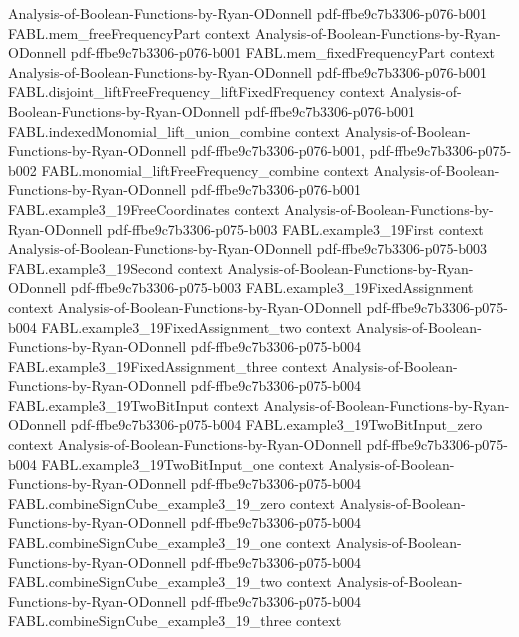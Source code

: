 \begin{theorem}
  {Analysis-of-Boolean-Functions-by-Ryan-ODonnell}
  {pdf-ffbe9c7b3306-p076-b001}
\proofstep
  {FABL.mem_freeFrequencyPart}
  {context}
  {Analysis-of-Boolean-Functions-by-Ryan-ODonnell}
  {pdf-ffbe9c7b3306-p076-b001}
\proofstep
  {FABL.mem_fixedFrequencyPart}
  {context}
  {Analysis-of-Boolean-Functions-by-Ryan-ODonnell}
  {pdf-ffbe9c7b3306-p076-b001}
\proofstep
  {FABL.disjoint_liftFreeFrequency_liftFixedFrequency}
  {context}
  {Analysis-of-Boolean-Functions-by-Ryan-ODonnell}
  {pdf-ffbe9c7b3306-p076-b001}
\proofstep
  {FABL.indexedMonomial_lift_union_combine}
  {context}
  {Analysis-of-Boolean-Functions-by-Ryan-ODonnell}
  {pdf-ffbe9c7b3306-p076-b001,
    pdf-ffbe9c7b3306-p075-b002}
\proofstep
  {FABL.monomial_liftFreeFrequency_combine}
  {context}
  {Analysis-of-Boolean-Functions-by-Ryan-ODonnell}
  {pdf-ffbe9c7b3306-p076-b001}
\proofstep
  {FABL.example3_19FreeCoordinates}
  {context}
  {Analysis-of-Boolean-Functions-by-Ryan-ODonnell}
  {pdf-ffbe9c7b3306-p075-b003}
\proofstep
  {FABL.example3_19First}
  {context}
  {Analysis-of-Boolean-Functions-by-Ryan-ODonnell}
  {pdf-ffbe9c7b3306-p075-b003}
\proofstep
  {FABL.example3_19Second}
  {context}
  {Analysis-of-Boolean-Functions-by-Ryan-ODonnell}
  {pdf-ffbe9c7b3306-p075-b003}
\proofstep
  {FABL.example3_19FixedAssignment}
  {context}
  {Analysis-of-Boolean-Functions-by-Ryan-ODonnell}
  {pdf-ffbe9c7b3306-p075-b004}
\proofstep
  {FABL.example3_19FixedAssignment_two}
  {context}
  {Analysis-of-Boolean-Functions-by-Ryan-ODonnell}
  {pdf-ffbe9c7b3306-p075-b004}
\proofstep
  {FABL.example3_19FixedAssignment_three}
  {context}
  {Analysis-of-Boolean-Functions-by-Ryan-ODonnell}
  {pdf-ffbe9c7b3306-p075-b004}
\proofstep
  {FABL.example3_19TwoBitInput}
  {context}
  {Analysis-of-Boolean-Functions-by-Ryan-ODonnell}
  {pdf-ffbe9c7b3306-p075-b004}
\proofstep
  {FABL.example3_19TwoBitInput_zero}
  {context}
  {Analysis-of-Boolean-Functions-by-Ryan-ODonnell}
  {pdf-ffbe9c7b3306-p075-b004}
\proofstep
  {FABL.example3_19TwoBitInput_one}
  {context}
  {Analysis-of-Boolean-Functions-by-Ryan-ODonnell}
  {pdf-ffbe9c7b3306-p075-b004}
\proofstep
  {FABL.combineSignCube_example3_19_zero}
  {context}
  {Analysis-of-Boolean-Functions-by-Ryan-ODonnell}
  {pdf-ffbe9c7b3306-p075-b004}
\proofstep
  {FABL.combineSignCube_example3_19_one}
  {context}
  {Analysis-of-Boolean-Functions-by-Ryan-ODonnell}
  {pdf-ffbe9c7b3306-p075-b004}
\proofstep
  {FABL.combineSignCube_example3_19_two}
  {context}
  {Analysis-of-Boolean-Functions-by-Ryan-ODonnell}
  {pdf-ffbe9c7b3306-p075-b004}
\proofstep
  {FABL.combineSignCube_example3_19_three}
  {context}

\end{theorem}
